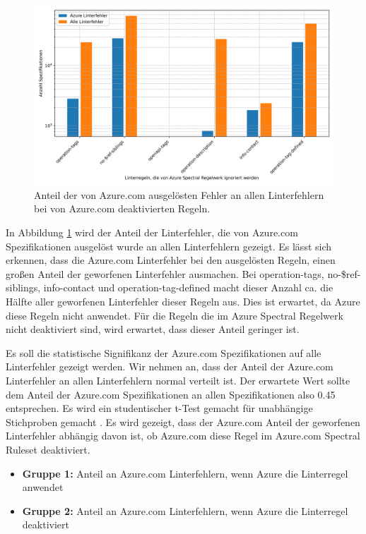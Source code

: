 \begin{figure}[htbp]
  \centering
  \includegraphics[width=1\linewidth]{img/azurespecthrownbarplot.png}
  \caption{Anteil der von Azure.com ausgelösten Fehler an allen Linterfehlern bei von Azure.com deaktivierten Regeln.}
  \label{fig:azurespecthrownbarplot}
\end{figure}

In Abbildung \ref{fig:azurespecthrownbarplot} wird der Anteil der Linterfehler, die von Azure.com Spezifikationen ausgelöst wurde an allen Linterfehlern gezeigt. Es lässt sich erkennen, dass die Azure.com Linterfehler bei den ausgelösten Regeln, einen großen Anteil der geworfenen Linterfehler ausmachen. Bei operation-tags, no-\$ref-siblings, info-contact und operation-tag-defined macht dieser Anzahl ca. die Hälfte aller geworfenen Linterfehler dieser Regeln aus. Dies ist erwartet, da Azure diese Regeln nicht anwendet. Für die Regeln die im Azure Spectral Regelwerk nicht deaktiviert sind, wird erwartet, dass dieser Anteil geringer ist. 

Es soll die statistische Signifikanz der Azure.com Spezifikationen auf alle Linterfehler gezeigt werden. Wir nehmen an, dass der Anteil der Azure.com Linterfehler an allen Linterfehlern normal verteilt ist. Der erwartete Wert sollte dem Anteil der Azure.com Spezifikationen an allen Spezifikationen also 0.45 entsprechen. Es wird ein studentischer t-Test gemacht für unabhängige Stichproben gemacht \parencite{mittag_statistik_2023}. Es wird gezeigt, dass der Azure.com Anteil der geworfenen Linterfehler abhängig davon ist, ob Azure.com diese Regel im Azure.com Spectral Ruleset deaktiviert.

\begin{itemize}
  \item \textbf{Gruppe 1:} Anteil an Azure.com Linterfehlern, wenn Azure die Linterregel anwendet
  \item \textbf{Gruppe 2:} Anteil an Azure.com Linterfehlern, wenn Azure die Linterregel deaktiviert
\end{itemize}

